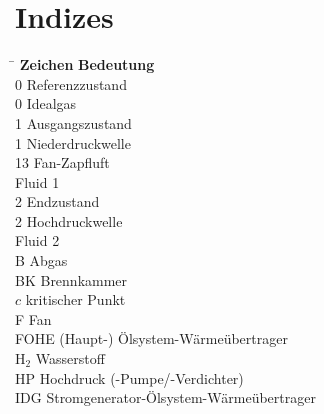 \section*{Indizes}

\begin{tabbing}
	\hspace*{3cm} \= \hspace*{8cm} \kill
	\textbf{Zeichen} \> \textbf{Bedeutung} 							\\[5mm]
    0       \>  Referenzzustand					                    \\
    0       \>  Idealgas                                            \\
	1		\>	Ausgangszustand                                     \\
    1       \>  Niederdruckwelle                                    \\
    13 		\> 	Fan-Zapfluft 										\\
     \>  Fluid 1                                             \\
	2		\>	Endzustand								            \\
    2       \>  Hochdruckwelle                                      \\
     \>  Fluid 2                                             \\
    B       \>  Abgas                                               \\
    BK      \>  Brennkammer                                         \\
    $c$     \>  kritischer Punkt                                    \\
    F       \>  Fan                                                 \\
    FOHE    \>  (Haupt-) Ölsystem-Wärmeübertrager                   \\
    H$_2$   \>  Wasserstoff                                         \\
    HP      \>  Hochdruck (-Pumpe/-Verdichter)                      \\
    IDG     \>  Stromgenerator-Ölsystem-Wärmeübertrager             \\

\end{tabbing}
